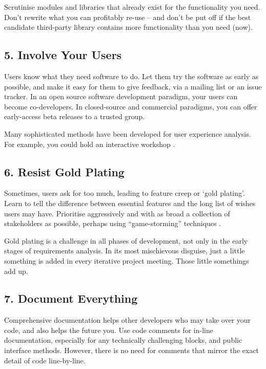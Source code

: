 \documentclass{bmcart}
\begin{document}
Scrutinise modules and libraries that already exist for the functionality you need. Don't rewrite what you can profitably re-use -- and don't be put off if the best candidate third-party library contains more functionality than you need (now).  

\subsection*{5. Involve Your Users}

Users know what they need software to do. Let them try the software as early as possible, and make it easy for them to give feedback, via a mailing list or an issue tracker. In an open source software development paradigm, your users can become co-developers. In closed-source and commercial paradigms, you can offer early-access beta releases to a trusted group.  

Many sophisticated methods have been developed for user experience analysis. For example, you could hold an interactive workshop \cite{pavelin2014}. 

\subsection*{6. Resist Gold Plating}

Sometimes, users ask for too much, leading to feature creep or `gold plating'. Learn to tell the difference between essential features and the long list of wishes users may have. Prioritise aggressively and with as broad a collection of stakeholders as possible, perhaps using ``game-storming'' techniques \cite{gamestorm}.   

Gold plating is a challenge in all phases of development, not only in the early stages of requirements analysis. In its most mischievous disguise, just a little something is added in every iterative project meeting. Those little somethings add up. 

\subsection*{7. Document Everything}

Comprehensive documentation helps other developers who may take over your code, and also helps the future you. Use code comments for in-line documentation, especially for any technically challenging blocks, and public interface methods. However, there is no need for comments that mirror the exact detail of code line-by-line. 
\end{document}
